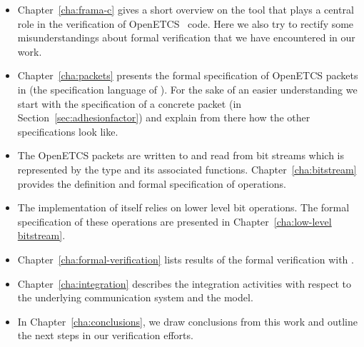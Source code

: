 \begin{itemize}
\item
Chapter~\ref{cha:frama-c} gives a short overview on the \framacwp tool
that plays a central role in the verification of OpenETCS \isoc~code.
Here we also try to rectify some misunderstandings about formal verification
that we have encountered in our work.

\item
Chapter~\ref{cha:packets} presents the formal specification of OpenETCS
packets in \acsl (the specification language of \framac).
For the sake of an easier understanding we start with the specification of
a concrete packet (\adhesion in Section~\ref{sec:adhesionfactor})
and explain from there how the other specifications look like.

\item
The OpenETCS packets are written to and read from bit streams which is represented
by the type  and its associated functions.
Chapter~\ref{cha:bitstream} provides the definition and formal specification
of  operations.

\item
The implementation of  itself relies on lower level bit operations.
The formal specification of these operations are presented in Chapter~\ref{cha:low-level bitstream}.

\item 
Chapter~\ref{cha:formal-verification} lists results of the formal verification with \framacwp.

\item 
Chapter~\ref{cha:integration} describes the integration activities with respect to the underlying
communication system and the \scade model.

\item
In Chapter~\ref{cha:conclusions}, we draw conclusions from this work
and outline the next steps in our verification efforts.
\end{itemize}

